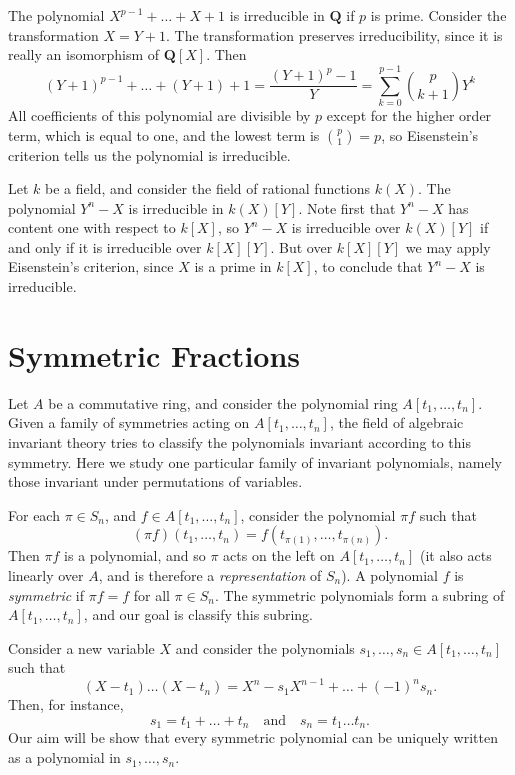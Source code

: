 \begin{example}
    The polynomial $X^{p-1} + \dots + X + 1$ is irreducible in $\mathbf{Q}$ if $p$ is prime. Consider the transformation $X = Y + 1$. The transformation preserves irreducibility, since it is really an isomorphism of $\mathbf{Q}[X]$. Then
    \[ (Y + 1)^{p-1} + \dots + (Y + 1) + 1 = \frac{(Y + 1)^p - 1}{Y} = \sum_{k = 0}^{p-1} \binom{p}{k+1} Y^k \]
    All coefficients of this polynomial are divisible by $p$ except for the higher order term, which is equal to one, and the lowest term is $\binom{p}{1} = p$, so Eisenstein's criterion tells us the polynomial is irreducible.
\end{example}

\begin{example}
    Let $k$ be a field, and consider the field of rational functions $k(X)$. The polynomial $Y^n - X$ is irreducible in $k(X)[Y]$. Note first that $Y^n - X$ has content one with respect to $k[X]$, so $Y^n - X$ is irreducible over $k(X)[Y]$ if and only if it is irreducible over $k[X][Y]$. But over $k[X][Y]$ we may apply Eisenstein's criterion, since $X$ is a prime in $k[X]$, to conclude that $Y^n - X$ is irreducible.
\end{example}


\section{Symmetric Fractions}

Let $A$ be a commutative ring, and consider the polynomial ring $A[t_1,\dots,t_n]$. Given a family of symmetries acting on $A[t_1,\dots,t_n]$, the field of algebraic invariant theory tries to classify the polynomials invariant according to this symmetry. Here we study one particular family of invariant polynomials, namely those invariant under permutations of variables.

For each $\pi \in S_n$, and $f \in A[t_1,\dots,t_n]$, consider the polynomial $\pi f$ such that
%
\[ (\pi f)(t_1,\dots,t_n) = f(t_{\pi(1)}, \dots, t_{\pi(n)}). \]
%
Then $\pi f$ is a polynomial, and so $\pi$ acts on the left on $A[t_1,\dots,t_n]$ (it also acts linearly over $A$, and is therefore a \emph{representation} of $S_n$). A polynomial $f$ is \emph{symmetric} if $\pi f = f$ for all $\pi \in S_n$. The symmetric polynomials form a subring of $A[t_1,\dots,t_n]$, and our goal is classify this subring.

Consider a new variable $X$ and consider the polynomials $s_1,\dots,s_n \in A[t_1,\dots,t_n]$ such that
%
\[ (X - t_1) \dots (X - t_n) = X^n - s_1 X^{n-1} + \dots + (-1)^n s_n. \]
%
Then, for instance,
%
\[ s_1 = t_1 + \dots + t_n \quad\text{and}\quad s_n = t_1 \dots t_n. \]
%
Our aim will be show that every symmetric polynomial can be uniquely written as a polynomial in $s_1,\dots,s_n$.













